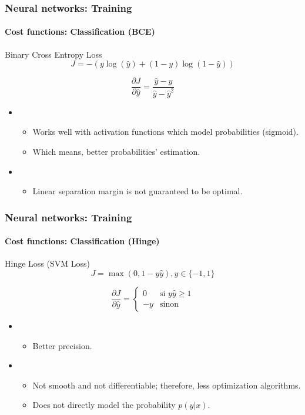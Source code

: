 \documentclass[xcolor=table]{beamer}
\begin{document}
\begin{frame}
	\frametitle{Neural networks: Training}
	\framesubtitle{Cost functions: Classification (BCE)}

\begin{block}{Binary Cross Entropy Loss}
	\[J = - (y \log(\hat{y}) + (1 - y) \log(1 - \hat{y}))\]
	
	\[
	\frac{\partial J}{\partial \hat{y}} = \frac{\hat{y} - y}{\hat{y} - \hat{y}^2}
	\]
\end{block}

\begin{itemize}
	\item {}
	\begin{itemize}
		\item Works well with activation functions which model probabilities (sigmoid).
		\item Which means, better probabilities' estimation.
	\end{itemize}
	\item {}
	\begin{itemize}
		\item Linear separation margin is not guaranteed to be optimal.
	\end{itemize}
\end{itemize}

\end{frame}

\begin{frame}
	\frametitle{Neural networks: Training}
	\framesubtitle{Cost functions: Classification (Hinge)}

\begin{block}{Hinge Loss (SVM Loss)}
	\[J = \max(0, 1 - y \hat{y}), y \in \{-1, 1\}\]
	
	\[
	\frac{\partial J}{\partial \hat{y}} = 
	\begin{cases}
	0 & \text{si } y \hat{y} \ge 1 \\
	-y & \text{sinon}
	\end{cases}
	\]
\end{block}

\begin{itemize}
	\item {}
	\begin{itemize}
		\item Better precision.
	\end{itemize}
	\item {}
	\begin{itemize}
		\item Not smooth and not differentiable; therefore, less optimization algorithms.
		\item Does not directly model the probability $p(y|x)$.
	\end{itemize}
\end{itemize}

\end{frame}
\end{document}
